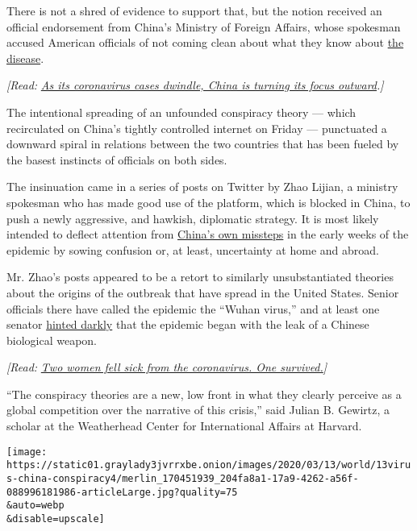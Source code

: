 There is not a shred of evidence to support that, but the notion
received an official endorsement from China's Ministry of Foreign
Affairs, whose spokesman accused American officials of not coming clean
about what they know about
\href{https://www.nytimes3xbfgragh.onion/2020/03/13/world/coronavirus-news.html}{the
disease}.

\emph{{[}Read:}
\href{http://www.nytimes3xbfgragh.onion/2020/03/18/world/asia/coronavirus-china-aid.html}{\emph{As
its coronavirus cases dwindle, China is turning its focus
outward}}\emph{.{]}}

The intentional spreading of an unfounded conspiracy theory --- which
recirculated on China's tightly controlled internet on Friday ---
punctuated a downward spiral in relations between the two countries that
has been fueled by the basest instincts of officials on both sides.

The insinuation came in a series of posts on Twitter by Zhao Lijian, a
ministry spokesman who has made good use of the platform, which is
blocked in China, to push a newly aggressive, and hawkish, diplomatic
strategy. It is most likely intended to deflect attention from
\href{https://www.nytimes3xbfgragh.onion/2020/02/01/world/asia/china-coronavirus.html}{China's
own missteps} in the early weeks of the epidemic by sowing confusion or,
at least, uncertainty at home and abroad.

Mr. Zhao's posts appeared to be a retort to similarly unsubstantiated
theories about the origins of the outbreak that have spread in the
United States. Senior officials there have called the epidemic the
``Wuhan virus,'' and at least one senator
\href{https://www.nytimes3xbfgragh.onion/2020/02/17/business/media/coronavirus-tom-cotton-china.html}{hinted
darkly} that the epidemic began with the leak of a Chinese biological
weapon.

\emph{{[}Read:}
\href{http://www.nytimes3xbfgragh.onion/interactive/2020/03/13/world/asia/coronavirus-death-life.html}{\emph{Two
women fell sick from the coronavirus. One survived.}}\emph{{]}}

``The conspiracy theories are a new, low front in what they clearly
perceive as a global competition over the narrative of this crisis,''
said Julian B. Gewirtz, a scholar at the Weatherhead Center for
International Affairs at Harvard.

\texttt{[image: https://static01.graylady3jvrrxbe.onion/images/2020/03/13/world/13virus-china-conspiracy4/merlin\_170451939\_204fa8a1-17a9-4262-a56f-088996181986-articleLarge.jpg?quality=75\\\&auto=webp\\\&disable=upscale]}

